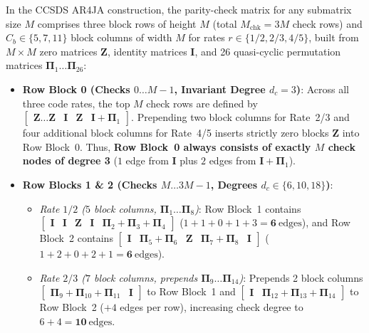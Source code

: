 \documentclass[10pt]{article}
\begin{document}
In the CCSDS AR4JA construction, the parity-check matrix for any submatrix size $M$ comprises three block rows of height $M$ (total $M_{\mathrm{chk}} = 3M$ check rows) and $C_b \in \{5, 7, 11\}$ block columns of width $M$ for rates $r \in \{1/2, 2/3, 4/5\}$, built from $M \times M$ zero matrices $\mathbf{Z}$, identity matrices $\mathbf{I}$, and 26 quasi-cyclic permutation matrices $\mathbf{\Pi}_1 \dots \mathbf{\Pi}_{26}$:
\begin{itemize}[leftmargin=1.8em, itemsep=2pt]
    \item \textbf{Row Block 0 (Checks $0 \dots M-1$, Invariant Degree $d_c = 3$)}: Across all three code rates, the top $M$ check rows are defined by $\begin{bmatrix} \mathbf{Z} \dots \mathbf{Z} & \mathbf{I} & \mathbf{Z} & \mathbf{I} + \mathbf{\Pi}_1 \end{bmatrix}$. Prepending two block columns for Rate~2/3 and four additional block columns for Rate~4/5 inserts strictly zero blocks $\mathbf{Z}$ into Row Block~0. Thus, \textbf{Row Block~0 always consists of exactly $M$ check nodes of degree 3} ($1$ edge from $\mathbf{I}$ plus $2$ edges from $\mathbf{I}+\mathbf{\Pi}_1$).
    \item \textbf{Row Blocks 1 \& 2 (Checks $M \dots 3M-1$, Degrees $d_c \in \{6, 10, 18\}$)}:
    \begin{itemize}[leftmargin=1.5em, itemsep=1pt]
        \item \emph{Rate $1/2$ ($5$ block columns, $\mathbf{\Pi}_1 \dots \mathbf{\Pi}_8$)}: Row Block~1 contains $\begin{bmatrix}\mathbf{I} & \mathbf{I} & \mathbf{Z} & \mathbf{I} & \mathbf{\Pi}_2+\mathbf{\Pi}_3+\mathbf{\Pi}_4\end{bmatrix}$ ($1+1+0+1+3 = \mathbf{6\ \mathrm{edges}}$), and Row Block~2 contains $\begin{bmatrix}\mathbf{I} & \mathbf{\Pi}_5+\mathbf{\Pi}_6 & \mathbf{Z} & \mathbf{\Pi}_7+\mathbf{\Pi}_8 & \mathbf{I}\end{bmatrix}$ ($1+2+0+2+1 = \mathbf{6\ \mathrm{edges}}$).
        \item \emph{Rate $2/3$ ($7$ block columns, prepends $\mathbf{\Pi}_9 \dots \mathbf{\Pi}_{14}$)}: Prepends 2 block columns $\begin{bmatrix}\mathbf{\Pi}_9+\mathbf{\Pi}_{10}+\mathbf{\Pi}_{11} & \mathbf{I}\end{bmatrix}$ to Row Block~1 and $\begin{bmatrix}\mathbf{I} & \mathbf{\Pi}_{12}+\mathbf{\Pi}_{13}+\mathbf{\Pi}_{14}\end{bmatrix}$ to Row Block~2 ($+4$ edges per row), increasing check degree to $6 + 4 = \mathbf{10\ \mathrm{edges}}$.

\end{itemize}
\end{itemize}
\end{document}
